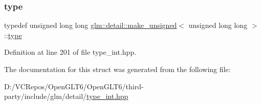 \subsubsection{\texorpdfstring{type}{type}}
{\footnotesize\ttfamily typedef unsigned long long \mbox{\hyperlink{structglm_1_1detail_1_1make__unsigned}{glm\+::detail\+::make\+\_\+unsigned}}$<$ unsigned long long $>$\+::\mbox{\hyperlink{structglm_1_1detail_1_1make__unsigned_3_01unsigned_01long_01long_01_4_a3f3f1eb1cbdd286e6cb4afb5fa71d5c7}{type}}}



Definition at line 201 of file type\+\_\+int.\+hpp.



The documentation for this struct was generated from the following file\+:\begin{DoxyCompactItemize}
\item 
D\+:/\+V\+C\+Repos/\+Open\+G\+L\+T6/\+Open\+G\+L\+T6/third-\/party/include/glm/detail/\mbox{\hyperlink{type__int_8hpp}{type\+\_\+int.\+hpp}}\end{DoxyCompactItemize}
